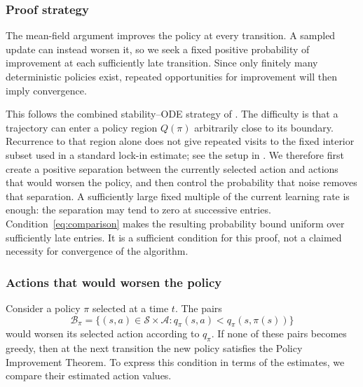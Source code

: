 \documentclass[twoside,11pt]{article}
\DeclareRobustCommand{\reviewbarstart}{%
  \ifhmode %
    \vadjust{\vbox to 0pt{%
      \vskip-\ht\strutbox %
      \vskip-\dp\strutbox %
      \cbstart[\changebarwidth] %
      \vss %
    }}%
  \else %
    \cbstart[\changebarwidth]%
  \fi %
} %
\providecommand{\DIFadd}[1]{#1} %
\providecommand{\DIFaddbegin}{\reviewbarstart} %
\providecommand{\DIFaddend}{\protect\cbend} %
\def\DIFadd#1{#1}%
\def\DIFaddbegin{}%
\def\DIFaddend{}%
\begin{document}
 \DIFaddbegin \subsubsection{\DIFadd{Proof strategy}}
\label{sec: limitations of existing methods}
\DIFadd{The }\DIFaddend mean-field  \DIFaddbegin \DIFadd{argument improves the policy at every transition. A sampled update can instead worsen it, so we seek a fixed positive probability of improvement at each sufficiently late transition. Since only finitely many deterministic policies exist, repeated opportunities for improvement will then imply convergence.
}\DIFaddend 

 \DIFaddbegin \DIFadd{This follows the }\DIFaddend combined  \DIFaddbegin \DIFadd{stability--ODE strategy of \citet[Section~5.4]{Kushner2003StochasticApplications}. The difficulty is that a trajectory can enter a policy region $Q(\pi)$ arbitrarily close to its boundary. Recurrence to that region alone does not give repeated visits to the fixed interior subset used in a standard }\DIFaddend lock-in  \DIFaddbegin \DIFadd{estimate; see the setup in \citet[Section~3]{Borkar2002OnApproximation}.
We therefore first create a positive separation between the currently selected action and actions that would worsen the policy}\DIFaddend , and then  \DIFaddbegin \DIFadd{control the probability that noise removes that separation. A sufficiently large fixed multiple of }\DIFaddend the  \DIFaddbegin \DIFadd{current learning rate is enough: the separation may tend to zero at successive entries. Condition~\eqref{eq:comparison} makes the resulting probability bound uniform over sufficiently late entries. It is a sufficient condition for this proof, not a claimed necessity for convergence of the algorithm.
}\DIFaddend 

 \DIFaddbegin \subsubsection{\DIFadd{Actions that would worsen the policy}}
\DIFadd{Consider a policy $\pi$ selected at a time $t$. The pairs
}\[
\DIFadd{\mathcal B_\pi=\big\{(s,a)\in\mathcal S\times\mathcal A:
q_\pi(s,a)<q_\pi(s,\pi(s))\big\}
}\]\DIFaddend 
 \DIFaddbegin \DIFadd{would worsen its selected action according to $q_\pi$. If none of these pairs becomes greedy, then at the next transition the new policy satisfies the Policy Improvement Theorem. To express this condition in terms of the estimates, we compare their estimated action values}\DIFaddend .
\end{document}
